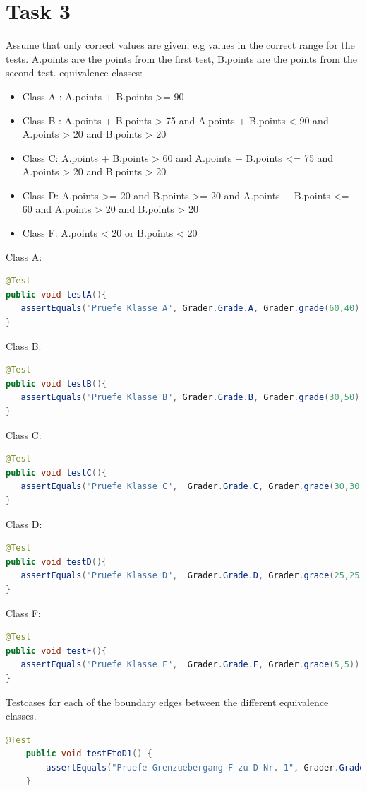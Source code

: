 \chapter{Task 3}
\begin{parlist}
\item Assume that only correct values are given, e.g values in the correct range for the tests. A.points are the points from the first test, B.points are the points from the second test.
equivalence classes:
\begin{itemize}
\item Class A :  A.points + B.points >= 90 
\item Class B :  A.points + B.points > 75  and  A.points + B.points < 90 and A.points > 20 and B.points > 20
\item Class C:  A.points + B.points > 60  and  A.points + B.points <= 75 and A.points > 20 and B.points > 20
\item Class D:  A.points >= 20 and B.points >= 20  and  A.points + B.points <= 60 and A.points > 20 and B.points > 20
\item Class F:  A.points < 20 or B.points < 20
\end{itemize}
\item 
Class A:
\begin{lstlisting}[language=java,frame=trBL]
@Test
public void testA(){
   assertEquals("Pruefe Klasse A", Grader.Grade.A, Grader.grade(60,40));
}
\end{lstlisting}
Class B:
\begin{lstlisting}[language=java,frame=trBL]
@Test
public void testB(){
   assertEquals("Pruefe Klasse B", Grader.Grade.B, Grader.grade(30,50));
}
\end{lstlisting}
Class C:
\begin{lstlisting}[language=java,frame=trBL]
@Test
public void testC(){
   assertEquals("Pruefe Klasse C",  Grader.Grade.C, Grader.grade(30,30));
}
\end{lstlisting}
Class D:
\begin{lstlisting}[language=java,frame=trBL]
@Test
public void testD(){
   assertEquals("Pruefe Klasse D",  Grader.Grade.D, Grader.grade(25,25));
}
\end{lstlisting}
Class F:
\begin{lstlisting}[language=java,frame=trBL]
@Test
public void testF(){
   assertEquals("Pruefe Klasse F",  Grader.Grade.F, Grader.grade(5,5));
}
\end{lstlisting}

\item Testcases for each of the boundary edges between the different equivalence classes.
\begin{lstlisting}[language=java,frame=trBL]
	@Test
	public void testFtoD1() {
		assertEquals("Pruefe Grenzuebergang F zu D Nr. 1", Grader.Grade.F, Grader.grade(30, 19));
	}


\end{lstlisting}
\end{parlist}
